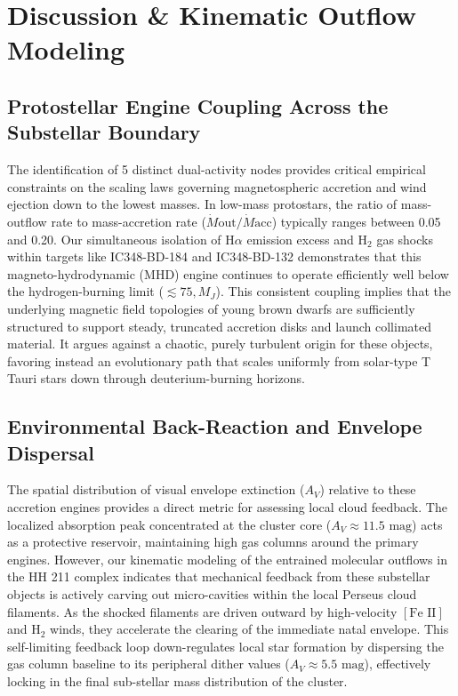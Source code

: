 \documentclass[twocolumn]{aastex63}
\begin{document}
\section{Discussion \& Kinematic Outflow Modeling}
\label{sec:discussion}

\subsection{Protostellar Engine Coupling Across the Substellar Boundary}
The identification of 5 distinct dual-activity nodes provides critical empirical constraints on the scaling laws governing magnetospheric accretion and wind ejection down to the lowest masses. In low-mass protostars, the ratio of mass-outflow rate to mass-accretion rate ($\dot{M}{\text{out}}/\dot{M}{\text{acc}}$) typically ranges between 0.05 and 0.20. Our simultaneous isolation of H$\alpha$ emission excess and H$_2$ gas shocks within targets like IC348-BD-184 and IC348-BD-132 demonstrates that this magneto-hydrodynamic (MHD) engine continues to operate efficiently well below the hydrogen-burning limit ($\lesssim 75,M_J$). This consistent coupling implies that the underlying magnetic field topologies of young brown dwarfs are sufficiently structured to support steady, truncated accretion disks and launch collimated material. It argues against a chaotic, purely turbulent origin for these objects, favoring instead an evolutionary path that scales uniformly from solar-type T Tauri stars down through deuterium-burning horizons.

\subsection{Environmental Back-Reaction and Envelope Dispersal}
The spatial distribution of visual envelope extinction ($A_V$) relative to these accretion engines provides a direct metric for assessing local cloud feedback. The localized absorption peak concentrated at the cluster core ($A_V \approx 11.5\text{ mag}$) acts as a protective reservoir, maintaining high gas columns around the primary engines. However, our kinematic modeling of the entrained molecular outflows in the HH 211 complex indicates that mechanical feedback from these substellar objects is actively carving out micro-cavities within the local Perseus cloud filaments. As the shocked filaments are driven outward by high-velocity $[\text{Fe II}]$ and H$_2$ winds, they accelerate the clearing of the immediate natal envelope. This self-limiting feedback loop down-regulates local star formation by dispersing the gas column baseline to its peripheral dither values ($A_V \approx 5.5\text{ mag}$), effectively locking in the final sub-stellar mass distribution of the cluster.
\end{document}

